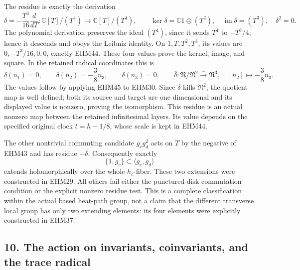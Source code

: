 \documentclass[
  10pt,
  a4paper,
]{article}
\begin{document}
The residue is exactly the derivation \[
\delta=-\frac{T^3}{16}\frac{d}{dT}:
\mathbb C[T]/(T^4)\longrightarrow\mathbb C[T]/(T^4),
\qquad
\ker\delta=\mathbb C1\oplus(T^2),\quad
\operatorname{im}\delta=(T^3),\quad\delta^2=0.
\tag{EHM45}
\] The polynomial derivation preserves the ideal \((T^4)\), since it
sends \(T^4\) to \(-T^6/4\); hence it descends and obeys the Leibniz
identity. On \(1,T,T^2,T^3\), its values are \(0,-T^3/16,0,0\), exactly
EHM44. These four values prove the kernel, image, and square. In the
retained radical coordinates this is \[
\delta(n_1)=0,\qquad\delta(n_2)=-\frac38n_3,
\qquad\delta(n_3)=0,
\qquad
\overline\delta:\mathfrak N/\mathfrak N^2\xrightarrow{\sim}\mathfrak N^3,
\quad[n_2]\longmapsto-\frac38n_3.
\tag{EHM46}
\] The values follow by applying EHM45 to EHM30. Since \(\delta\) kills
\(\mathfrak N^2\), the quotient map is well defined; both its source and
target are one dimensional and its displayed value is nonzero, proving
the isomorphism. This residue is an actual nonzero map between the
retained infinitesimal layers. Its value depends on the specified
original clock \(t=h-1/8\), whose scale is kept in EHM44.

The other nontrivial commuting candidate \(g_cg_d^2\) acts on \(T\) by
the negative of EHM43 and has residue \(-\delta\). Consequently exactly
\[
\{1,g_c\}\subset\langle g_c,g_d\rangle
\tag{EHM47}
\] extends holomorphically over the whole \(h_c\)-fiber. These two
extensions were constructed in EHM29. All others fail either the
punctured-disk commutation condition or the explicit nonzero residue
test. This is a complete classification within the actual based
heat-path group, not a claim that the different transverse local group
has only two extending elements: its four elements were explicitly
constructed in EHM37.

\subsection{10. The action on invariants, coinvariants, and the trace
radical}\label{the-action-on-invariants-coinvariants-and-the-trace-radical}
\end{document}

